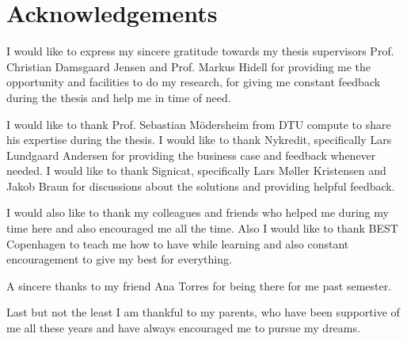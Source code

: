 \chapter{Acknowledgements}

I would like to express my sincere gratitude towards my thesis supervisors Prof. Christian Damsgaard Jensen and Prof. Markus Hidell for providing me the opportunity and facilities to do my research, for giving me constant feedback during the thesis and help me in time of need.

I would like to thank Prof. Sebastian Mödersheim from DTU compute to share his expertise during the thesis. I would like to thank Nykredit, specifically Lars Lundgaard Andersen for providing the business case and feedback whenever needed. I would like to thank Signicat, specifically Lars Møller Kristensen and Jakob Braun for discussions about the solutions and providing helpful feedback.

I would also like to thank my colleagues and friends who helped me during my time here and also encouraged me all the time. Also I would like to thank BEST Copenhagen to teach me how to have while learning and also constant encouragement to give my best for everything.

A sincere thanks to my friend Ana Torres for being there for me past semester.

Last but not the least I am thankful to my parents, who have been supportive of me all these years and have always encouraged me to pursue my dreams.
